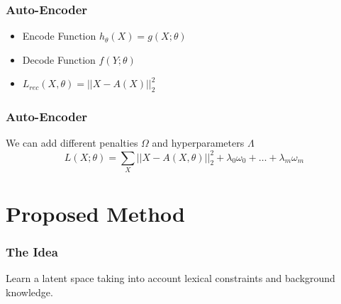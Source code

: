 \documentclass{beamer}
\begin{document}
\begin{frame}
  \frametitle{Auto-Encoder}
\begin{itemize}
  \setlength\itemsep{1em}
\item Encode Function $h_{\theta}(X) = g(X; \theta)$
\item Decode Function $f(Y; \theta)$
\item $L_{rec}(X, \theta) = || X - A(X)||_2^2$
\end{itemize}
  \begin{figure}[!h]
    \centering
    \label{fig:AE}
  \end{figure}
\end{frame}

\begin{frame}
  \frametitle{Auto-Encoder}
  We can add different penalties $\Omega$ and hyperparameters $\Lambda$
  \begin{equation*} 
    L(X;\theta) = \sum\limits_X|| X - A(X, \theta) ||_2^2 + \lambda_0 \omega_0 + 
    \ldots + \lambda_m \omega_m  
  \end{equation*}
\end{frame}

\section{Proposed Method}

\begin{frame}
\frametitle{The Idea}
Learn a latent space taking into account lexical constraints and
background knowledge.
\end{frame}
\end{document}
